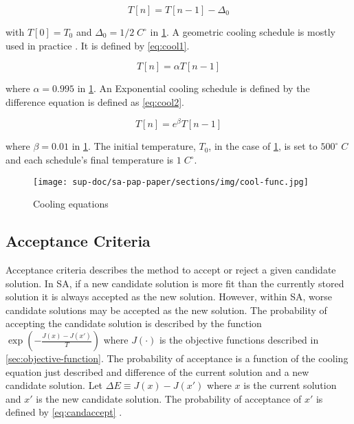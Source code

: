 \documentclass[11pt,a4paper,final]{article}
\newcommand{\Tau}{T}                        %
\begin{document}
\begin{equation}
\label{eq:cool0}
\Tau[n] = \Tau[n-1] - \Delta_0
\end{equation}

with \(\Tau[0] = \Tau_0\) and \(\Delta_0 = 1/2\; C^\circ\) in \ref{fig:cool}. A geometric cooling schedule is mostly used in practice
\cite{keller-2019-multi-objec}. It is defined by \ref{eq:cool1}.

\begin{equation}
\label{eq:cool1}
\Tau[n] = \alpha \Tau[n-1]
\end{equation}

where \(\alpha = 0.995\) in \ref{fig:cool}. An Exponential cooling schedule is defined by the difference equation is defined as
\ref{eq:cool2}.

\begin{equation}
\label{eq:cool2}
\Tau[n] = e^{\beta}\Tau[n-1]
\end{equation}

where \(\beta = 0.01\) in \ref{fig:cool}. The initial temperature, \(T_0\), in the case of \ref{fig:cool}, is set to \(500^\circ\; C\) and
each schedule's final temperature is \(1\; C^\circ\).

\begin{figure}[htbp]
\centering
\texttt{[image: sup-doc/sa-pap-paper/sections/img/cool-func.jpg]}
\caption{\label{fig:cool}Cooling equations}
\end{figure}

\subsection{Acceptance Criteria}
\label{sec:acceptance}
Acceptance criteria describes the method to accept or reject a given candidate solution. In SA, if a new candidate
solution is more fit than the currently stored solution it is always accepted as the new solution. However, within SA,
worse candidate solutions may be accepted as the new solution. The probability of accepting the candidate solution is
described by the function \(\exp(-\frac{J(x) - J(x')}{\Tau})\) where \(J(\cdot)\) is the objective functions described in
\ref{sec:objective-function}. The probability of acceptance is a function of the cooling equation just described and
difference of the current solution and a new candidate solution. Let \(\Delta E \equiv J(x) - J(x')\) where \(x\) is the current
solution and \(x'\) is the new candidate solution. The probability of acceptance of \(x'\) is defined by \ref{eq:candaccept}
\cite{keller-2019-multi-objec}.
\end{document}
